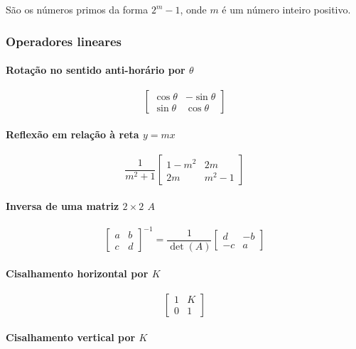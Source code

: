 São os números primos da forma $2^m - 1$, onde $m$ é um número inteiro positivo.

\subsubsection{Operadores lineares}

\paragraph{Rotação no sentido anti-horário por $\theta$}

\[
\begin{bmatrix}
\cos \theta & -\sin \theta \\
\sin \theta & \cos \theta
\end{bmatrix}
\]

\paragraph{Reflexão em relação à reta $y = mx$}

\[
\frac{1}{m^2 + 1}
\begin{bmatrix}
1 - m^2 & 2m \\
2m & m^2 - 1
\end{bmatrix}
\]

\paragraph{Inversa de uma matriz $2 \times 2$ $A$}

\[
\begin{bmatrix}
a & b \\
c & d
\end{bmatrix}^{-1}
= \frac{1}{\det(A)}
\begin{bmatrix}
d & -b \\
-c & a
\end{bmatrix}
\]

\paragraph{Cisalhamento horizontal por $K$}

\[
\begin{bmatrix}
1 & K \\
0 & 1
\end{bmatrix}
\]

\paragraph{Cisalhamento vertical por $K$}

